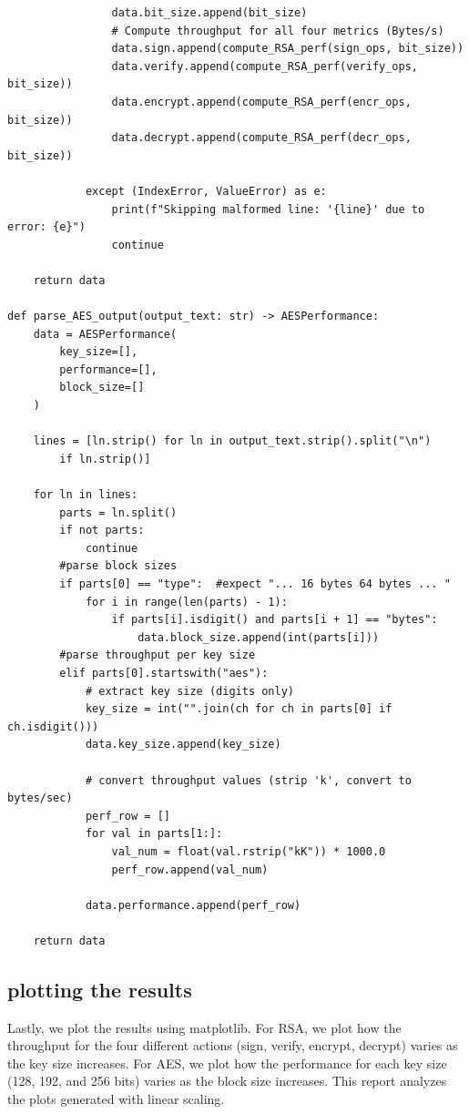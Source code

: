 \documentclass[11pt]{article}
\begin{document}
\begin{lstlisting}
                data.bit_size.append(bit_size)
                # Compute throughput for all four metrics (Bytes/s)
                data.sign.append(compute_RSA_perf(sign_ops, bit_size))
                data.verify.append(compute_RSA_perf(verify_ops, bit_size))
                data.encrypt.append(compute_RSA_perf(encr_ops, bit_size))
                data.decrypt.append(compute_RSA_perf(decr_ops, bit_size))

            except (IndexError, ValueError) as e:
                print(f"Skipping malformed line: '{line}' due to error: {e}")
                continue

    return data

def parse_AES_output(output_text: str) -> AESPerformance:
    data = AESPerformance(
        key_size=[],
        performance=[],
        block_size=[]
    )

    lines = [ln.strip() for ln in output_text.strip().split("\n")
		if ln.strip()]

    for ln in lines:
        parts = ln.split()
        if not parts:
            continue
        #parse block sizes
        if parts[0] == "type":  #expect "... 16 bytes 64 bytes ... "
            for i in range(len(parts) - 1):
                if parts[i].isdigit() and parts[i + 1] == "bytes":
                    data.block_size.append(int(parts[i]))
        #parse throughput per key size
        elif parts[0].startswith("aes"):
            # extract key size (digits only)
            key_size = int("".join(ch for ch in parts[0] if ch.isdigit()))
            data.key_size.append(key_size)

            # convert throughput values (strip 'k', convert to bytes/sec)
            perf_row = []
            for val in parts[1:]:
                val_num = float(val.rstrip("kK")) * 1000.0
                perf_row.append(val_num)

            data.performance.append(perf_row)

    return data
\end{lstlisting}

\subsection*{plotting the results}

Lastly, we plot the results using matplotlib. For RSA, we plot how the throughput for the four different actions (sign, verify, encrypt, decrypt) varies as the key size increases. For AES, we plot how the performance for each key size (128, 192, and 256 bits) varies as the block size increases. This report analyzes the plots generated with linear scaling.
\end{document}
